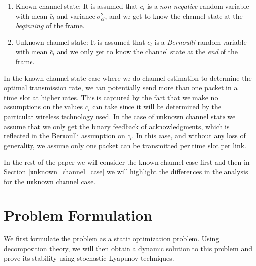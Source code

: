 \documentclass[conference]{IEEEtran}
\begin{document}
\begin{enumerate}
	\item Known channel state: It is assumed that $c_l$ is a \emph{non-negative} random variable with mean $\bar{c}_l$ and variance $\sigma_{cl}^2$, and we get to know the channel state at the \emph{beginning} of the frame.
	\item Unknown channel state: It is assumed that $c_l$ is a \emph{Bernoulli} random variable with mean $\bar{c}_l$ and we only get to know the channel state at the \emph{end} of the frame.
\end{enumerate}

In the known channel state case where we do channel estimation to determine the optimal transmission rate, we can potentially send more than one packet in a time slot at higher rates. This is captured by the fact that we make no assumptions on the values $c_l$ can take since it will be determined by the particular wireless technology used. In the case of unknown channel state we assume that we only get the binary feedback of acknowledgments, which is reflected in the Bernoulli assumption on $c_l$. In this case, and without any loss of generality, we assume only one packet can be transmitted per time slot per link.

In the rest of the paper we will consider the known channel case first and then in Section \ref{unknown_channel_case} we will highlight the differences in the analysis for the unknown channel case.

\section{Problem Formulation}
\label{formulation_kc}

We first formulate the problem as a static optimization problem. Using decomposition theory, we will then obtain a dynamic solution to this problem and prove its stability using stochastic Lyapunov techniques.
\end{document}
